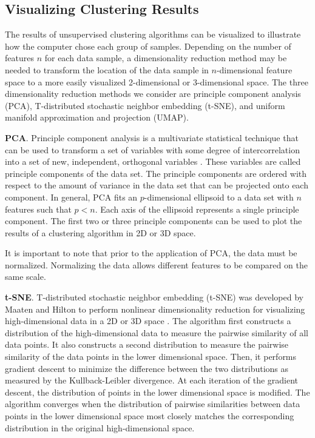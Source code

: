 \subsection{Visualizing Clustering Results} 

The results of unsupervised clustering algorithms can be visualized to illustrate how the computer chose each group of samples. Depending on the number of features $n$ for each data sample, a dimensionality reduction method may be needed to transform the location of the data sample in $n$-dimensional feature space to a more easily visualized 2-dimensional or 3-dimensional space. The three dimensionality reduction methods we consider are principle component analysis (PCA), T-distributed stochastic neighbor embedding (t-SNE), and uniform manifold approximation and projection (UMAP).

\textbf{PCA}. Principle component analysis is a multivariate statistical technique that can be used to transform a set of variables with some degree of intercorrelation into a set of new, independent, orthogonal variables \cite{Abdi2010}. These variables are called principle components of the data set. The principle components are ordered with respect to the amount of variance in the data set that can be projected onto each component. In general, PCA fits an $p$-dimensional ellipsoid to a data set with $n$ features such that $p < n$. Each axis of the ellipsoid represents a single principle component. The first two or three principle components can be used to plot the results of a clustering algorithm in 2D or 3D space.

It is important to note that prior to the application of PCA, the data must be normalized. Normalizing the data allows different features to be compared on the same scale.

\textbf{t-SNE}. T-distributed stochastic neighbor embedding (t-SNE) was developed by Maaten and Hilton to perform nonlinear dimensionality reduction for visualizing high-dimensional data in a 2D or 3D space \cite{Maaten2008}. The algorithm first constructs a distribution of the high-dimensional data to measure the pairwise similarity of all data points. It also constructs a second distribution to measure the pairwise similarity of the data points in the lower dimensional space. Then, it performs gradient descent to minimize the difference between the two distributions as measured by the Kullback-Leibler divergence. At each iteration of the gradient descent, the distribution of points in the lower dimensional space is modified. The algorithm converges when the distribution of pairwise similarities between data points in the lower dimensional space most closely matches the corresponding distribution in the original high-dimensional space.

